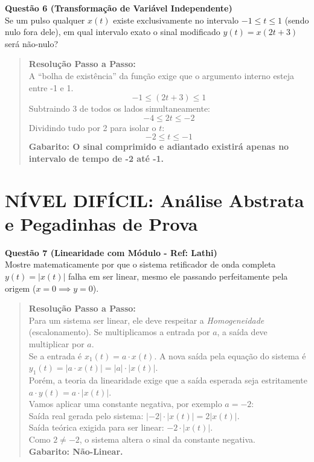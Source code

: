 \textbf{Questão 6 (Transformação de Variável Independente)}\\
Se um pulso qualquer \(x(t)\) existe exclusivamente no intervalo \(-1 \le t \le 1\) (sendo nulo fora dele), em qual intervalo exato o sinal modificado \(y(t) = x(2t + 3)\) será não-nulo?

\begin{quote}
\textbf{Resolução Passo a Passo:}\\
A ``bolha de existência'' da função exige que o argumento interno esteja entre -1 e 1.
\[-1 \le (2t + 3) \le 1\]
Subtraindo 3 de todos os lados simultaneamente:
\[-4 \le 2t \le -2\]
Dividindo tudo por 2 para isolar o \(t\):
\[-2 \le t \le -1\]
\textbf{Gabarito: O sinal comprimido e adiantado existirá apenas no intervalo de tempo de -2 até -1.}
\end{quote}

\section{NÍVEL DIFÍCIL: Análise Abstrata e Pegadinhas de Prova}\label{nuxedvel-difuxedcil-anuxe1lise-abstrata-e-pegadinhas-de-prova}

\textbf{Questão 7 (Linearidade com Módulo - Ref: Lathi)}\\
Mostre matematicamente por que o sistema retificador de onda completa \(y(t) = |x(t)|\) falha em ser linear, mesmo ele passando perfeitamente pela origem (\(x=0 \implies y=0\)).

\begin{quote}
\textbf{Resolução Passo a Passo:}\\
Para um sistema ser linear, ele deve respeitar a \emph{Homogeneidade} (escalonamento). Se multiplicamos a entrada por \(a\), a saída deve multiplicar por \(a\).\\
Se a entrada é \(x_1(t) = a \cdot x(t)\). A nova saída pela equação do sistema é \(y_1(t) = |a \cdot x(t)| = |a| \cdot |x(t)|\).\\
Porém, a teoria da linearidade exige que a saída esperada seja estritamente \(a \cdot y(t) = a \cdot |x(t)|\).\\
Vamos aplicar uma constante negativa, por exemplo \(a = -2\):\\
Saída real gerada pelo sistema: \(|-2| \cdot |x(t)| = 2 |x(t)|\).\\
Saída teórica exigida para ser linear: \(-2 \cdot |x(t)|\).\\
Como \(2 \neq -2\), o sistema altera o sinal da constante negativa.\\
\textbf{Gabarito: Não-Linear.}
\end{quote}

